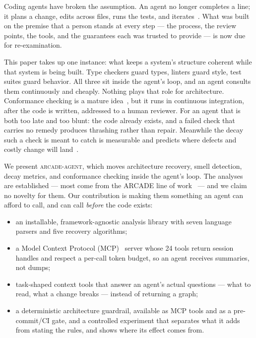 \documentclass[10pt,conference]{IEEEtran}
\newcommand{\arcade}{\textsc{arcade-agent}}
\begin{document}
Coding agents have broken the assumption. An agent no longer completes a line;
it plans a change, edits across files, runs the tests, and
iterates~\cite{sweagent,swebench}. What was built on the premise that a person
stands at every step --- the process, the review points, the tools, and the
guarantees each was trusted to provide --- is now due for re-examination.

This paper takes up one instance: what keeps a system's structure coherent while
that system is being built. Type checkers guard types, linters guard style, test
suites guard behavior. All three sit inside the agent's loop, and an agent
consults them continuously and cheaply. Nothing plays that role for
architecture. Conformance checking is a mature
idea~\cite{murphy1995reflexion,passos2010conformance,archunit}, but it runs in
continuous integration, after the code is written, addressed to a human
reviewer. For an agent that is both too late and too blunt: the code already
exists, and a failed check that carries no remedy produces thrashing rather than
repair. Meanwhile the decay such a check is meant to catch is measurable and
predicts where defects and costly change will
land~\cite{le2018decay,le2021decay-predictor}.

We present \arcade{}, which moves architecture recovery, smell detection, decay
metrics, and conformance checking inside the agent's loop. The analyses are
established --- most come from the ARCADE line of work~\cite{laser2020arcade} ---
and we claim no novelty for them. Our contribution is making them something an
agent can afford to call, and can call \emph{before} the code exists:
\begin{itemize}
  \item an installable, framework-agnostic analysis library with seven language
        parsers and five recovery algorithms;
  \item a Model Context Protocol (MCP)~\cite{mcp} server whose 24 tools return session handles and respect a
        per-call token budget, so an agent receives summaries, not dumps;
  \item task-shaped context tools that answer an agent's actual questions ---
        what to read, what a change breaks --- instead of returning a graph;
  \item a deterministic architecture guardrail, available as MCP tools and as a
        pre-commit/CI gate, and a controlled experiment that separates what it
        adds from stating the rules, and shows where its effect comes from.
\end{itemize}
\end{document}
